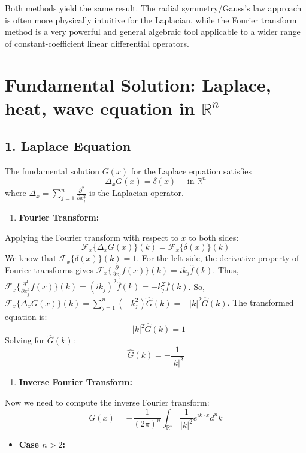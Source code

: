 Both methods yield the same result. The radial symmetry/Gauss's law approach is often more physically intuitive for the Laplacian, while the Fourier transform method is a very powerful and general algebraic tool applicable to a wider range of constant-coefficient linear differential operators.

\section{Fundamental Solution: Laplace, heat, wave equation in \texorpdfstring{$\mathbb{R}^{n}$}{mathbbR^n}}

\subsection{1. Laplace Equation}

The fundamental solution $G(x)$ for the Laplace equation satisfies
\[
\Delta_x G(x)=\delta(x) \quad \text { in } \mathbb{R}^n
\]
where $\Delta_x=\sum_{j=1}^n \frac{\partial^2}{\partial x_j^2}$ is the Laplacian operator.

\begin{enumerate}
	\item \textbf{Fourier Transform:}
\end{enumerate}

Applying the Fourier transform with respect to $x$ to both sides:
\[
\mathcal{F}_x\{\Delta_x G(x)\}(k)=\mathcal{F}_x\{\delta(x)\}(k)
\]
We know that $\mathcal{F}_x\{\delta(x)\}(k)=1$. For the left side, the derivative property of Fourier transforms gives $\mathcal{F}_x\{\frac{\partial}{\partial x_j} f(x)\}(k)=i k_j \widehat{f}(k)$. Thus, $\mathcal{F}_x\{\frac{\partial^2}{\partial x_j^2} f(x)\}(k)=\left(i k_j\right)^2 \widehat{f}(k)=-k_j^2 \widehat{f}(k)$.
So, $\mathcal{F}_x\{\Delta_x G(x)\}(k)=\sum_{j=1}^n\left(-k_j^2\right) \widehat{G}(k)=-|k|^2 \widehat{G}(k)$.
The transformed equation is:
\[
-|k|^2 \widehat{G}(k)=1
\]
Solving for $\widehat{G}(k)$:
\[
\widehat{G}(k)=-\frac{1}{|k|^2}
\]
\begin{enumerate}
	\item \textbf{Inverse Fourier Transform:}
\end{enumerate}

Now we need to compute the inverse Fourier transform:
\[
G(x)=-\frac{1}{(2 \pi)^n} \int_{\mathbb{R}^n} \frac{1}{|k|^2} e^{i k \cdot x} d^n k
\]
\begin{itemize}
	\item \textbf{Case $n>2$:}
\end{itemize}

